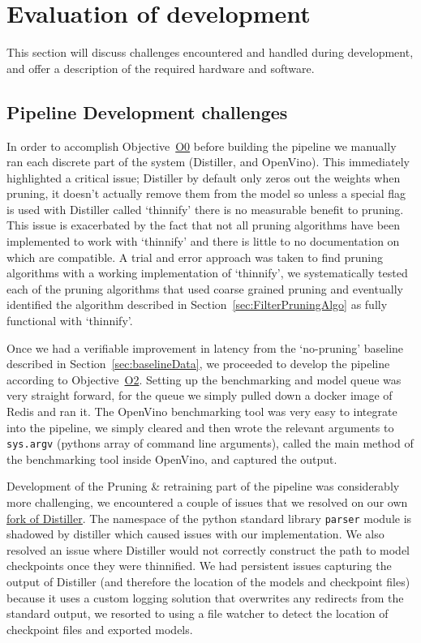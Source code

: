 \documentclass[../Dissertation.tex]{subfiles}
\begin{document}
\section{Evaluation of development}
This section will discuss challenges encountered and handled during development, and offer a description of the required hardware and software.

\subsection{Pipeline Development challenges}

In order to accomplish Objective~\hyperref[obj:VerifyComp]{O0} before building the pipeline we manually ran each discrete part of the system (Distiller, and OpenVino). 
This immediately highlighted a critical issue; Distiller by default only zeros out the weights when pruning, it doesn't actually remove them from the model so unless a special flag is used with Distiller called `thinnify' there is no measurable benefit to pruning. 
This issue is exacerbated by the fact that not all pruning algorithms have been implemented to work with `thinnify' and there is little to no documentation on which are compatible. 
A trial and error approach was taken to find pruning algorithms with a working implementation of `thinnify', we systematically tested each of the pruning algorithms that used coarse grained pruning and eventually identified the algorithm described in Section~\ref{sec:FilterPruningAlgo} as fully functional with `thinnify'.

Once we had a verifiable improvement in latency from the `no-pruning' baseline described in Section~\ref{sec:baselineData}, we proceeded to develop the pipeline according to Objective~\hyperref[obj:BuildPipeline]{O2}.
Setting up the benchmarking and model queue was very straight forward, for the queue we simply pulled down a docker image of Redis and ran it.
The OpenVino benchmarking tool was very easy to integrate into the pipeline, we simply cleared and then wrote the relevant arguments to \texttt{sys.argv} (pythons array of command line arguments), called the main method of the benchmarking tool inside OpenVino, and captured the output.

Development of the Pruning \& retraining part of the pipeline was considerably more challenging, we encountered a couple of issues that we resolved on our own \href{https://github.com/friedforfun/distiller?organization=friedforfun&organization=friedforfun}{\underline{\color{blue}fork of Distiller}}. The namespace of the python standard library \texttt{parser} module is shadowed by distiller which caused issues with our implementation.
We also resolved an issue where Distiller would not correctly construct the path to model checkpoints once they were thinnified.
We had persistent issues capturing the output of Distiller (and therefore the location of the models and checkpoint files) because it uses a custom logging solution that overwrites any redirects from the standard output, we resorted to using a file watcher to detect the location of checkpoint files and exported models.
\end{document}
